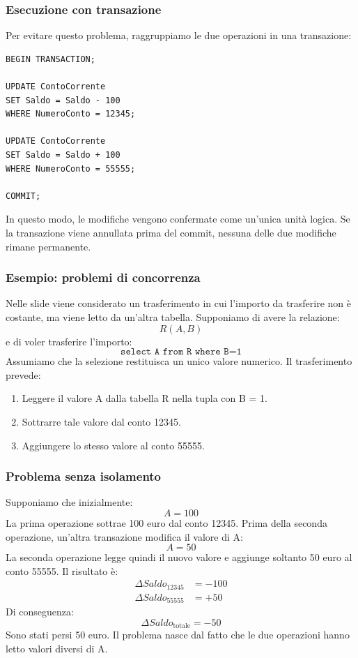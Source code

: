\subsubsection{Esecuzione con transazione}
Per evitare questo problema, raggruppiamo
le due operazioni in una transazione:
\begin{verbatim}
BEGIN TRANSACTION;

UPDATE ContoCorrente
SET Saldo = Saldo - 100
WHERE NumeroConto = 12345;

UPDATE ContoCorrente
SET Saldo = Saldo + 100
WHERE NumeroConto = 55555;

COMMIT;
\end{verbatim}
In questo modo, le modifiche vengono
confermate come un'unica unità logica.
Se la transazione viene annullata prima del commit,
nessuna delle due modifiche rimane permanente.
\subsubsection{Esempio: problemi di concorrenza}
Nelle slide viene considerato un trasferimento
in cui l'importo da trasferire non è costante,
ma viene letto da un'altra tabella.
Supponiamo di avere la relazione:
\[
R(A,B)
\]
e di voler trasferire l'importo:
\[
\texttt{select A from R where B=1}
\]
Assumiamo che la selezione restituisca
un unico valore numerico.
Il trasferimento prevede:
\begin{enumerate}
    \item Leggere il valore A dalla tabella R
    nella tupla con B = 1.
    \item Sottrarre tale valore dal conto 12345.
    \item Aggiungere lo stesso valore al conto 55555.
\end{enumerate}
\subsubsection{Problema senza isolamento}
Supponiamo che inizialmente:
\[
A = 100
\]
La prima operazione sottrae 100 euro
dal conto 12345.
Prima della seconda operazione, un'altra
transazione modifica il valore di A:
\[
A = 50
\]
La seconda operazione legge quindi il nuovo valore
e aggiunge soltanto 50 euro al conto 55555.
Il risultato è:
\[
\begin{aligned}
\Delta Saldo_{12345} &= -100\\
\Delta Saldo_{55555} &= +50
\end{aligned}
\]
Di conseguenza:
\[
\Delta Saldo_{\text{totale}} = -50
\]
Sono stati persi 50 euro.
Il problema nasce dal fatto che le due operazioni
hanno letto valori diversi di A.
